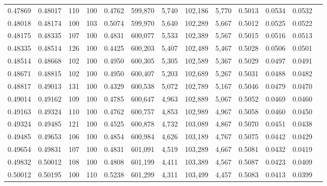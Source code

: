 \begin{tabular}{rrrrrrrrrrrrr}
0.47869 & 0.48017 &   110 & 100 &                                     0.4762 & 599,870 &   5,740 & 102,186 &   5,770 & 0.5013 & 0.0534 & 0.0532 \\
0.48018 & 0.48174 &   100 & 103 &                                     0.5074 & 599,970 &   5,640 & 102,289 &   5,667 & 0.5012 & 0.0525 & 0.0522 \\
0.48175 & 0.48335 &   107 & 100 &                                     0.4831 & 600,077 &   5,533 & 102,389 &   5,567 & 0.5015 & 0.0516 & 0.0513 \\
0.48335 & 0.48514 &   126 & 100 &                                     0.4425 & 600,203 &   5,407 & 102,489 &   5,467 & 0.5028 & 0.0506 & 0.0501 \\
0.48514 & 0.48668 &   102 & 100 &                                     0.4950 & 600,305 &   5,305 & 102,589 &   5,367 & 0.5029 & 0.0497 & 0.0491 \\
0.48671 & 0.48815 &   102 & 100 &                                     0.4950 & 600,407 &   5,203 & 102,689 &   5,267 & 0.5031 & 0.0488 & 0.0482 \\
0.48817 & 0.49013 &   131 & 100 &                                     0.4329 & 600,538 &   5,072 & 102,789 &   5,167 & 0.5046 & 0.0479 & 0.0470 \\
0.49014 & 0.49162 &   109 & 100 &                                     0.4785 & 600,647 &   4,963 & 102,889 &   5,067 & 0.5052 & 0.0469 & 0.0460 \\
0.49163 & 0.49324 &   110 & 100 &                                     0.4762 & 600,757 &   4,853 & 102,989 &   4,967 & 0.5058 & 0.0460 & 0.0450 \\
0.49324 & 0.49485 &   121 & 100 &                                     0.4525 & 600,878 &   4,732 & 103,089 &   4,867 & 0.5070 & 0.0451 & 0.0438 \\
0.49485 & 0.49653 &   106 & 100 &                                     0.4854 & 600,984 &   4,626 & 103,189 &   4,767 & 0.5075 & 0.0442 & 0.0429 \\
0.49654 & 0.49831 &   107 & 100 &                                     0.4831 & 601,091 &   4,519 & 103,289 &   4,667 & 0.5081 & 0.0432 & 0.0419 \\
0.49832 & 0.50012 &   108 & 100 &                                     0.4808 & 601,199 &   4,411 & 103,389 &   4,567 & 0.5087 & 0.0423 & 0.0409 \\
0.50012 & 0.50195 &   100 & 110 &                                     0.5238 & 601,299 &   4,311 & 103,499 &   4,457 & 0.5083 & 0.0413 & 0.0399 \\

\end{tabular}
